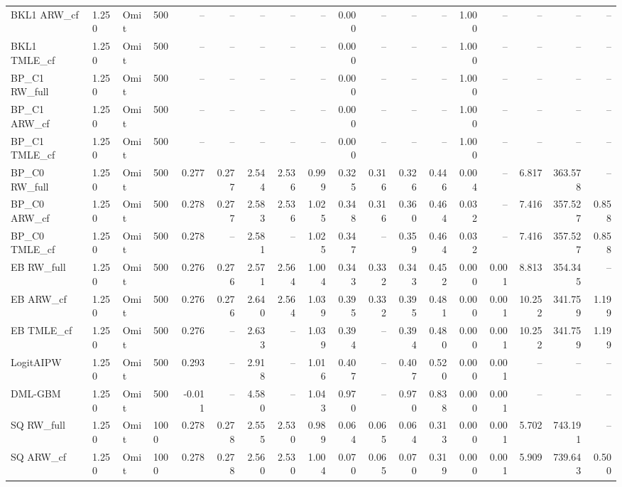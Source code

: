 \begin{tabular}{llllrrrrrrrrrrrrrr}
BKL1 ARW\_cf & 1.250 & Omit & 500 & -- & -- & -- & -- & -- & 0.000 & -- & -- & -- & 1.000 & -- & -- & -- & -- \\
BKL1 TMLE\_cf & 1.250 & Omit & 500 & -- & -- & -- & -- & -- & 0.000 & -- & -- & -- & 1.000 & -- & -- & -- & -- \\
BP\_C1 RW\_full & 1.250 & Omit & 500 & -- & -- & -- & -- & -- & 0.000 & -- & -- & -- & 1.000 & -- & -- & -- & -- \\
BP\_C1 ARW\_cf & 1.250 & Omit & 500 & -- & -- & -- & -- & -- & 0.000 & -- & -- & -- & 1.000 & -- & -- & -- & -- \\
BP\_C1 TMLE\_cf & 1.250 & Omit & 500 & -- & -- & -- & -- & -- & 0.000 & -- & -- & -- & 1.000 & -- & -- & -- & -- \\
BP\_C0 RW\_full & 1.250 & Omit & 500 & 0.277 & 0.277 & 2.544 & 2.536 & 0.999 & 0.325 & 0.316 & 0.326 & 0.446 & 0.004 & -- & 6.817 & 363.578 & -- \\
BP\_C0 ARW\_cf & 1.250 & Omit & 500 & 0.278 & 0.277 & 2.583 & 2.536 & 1.025 & 0.348 & 0.316 & 0.360 & 0.464 & 0.032 & -- & 7.416 & 357.527 & 0.858 \\
BP\_C0 TMLE\_cf & 1.250 & Omit & 500 & 0.278 & -- & 2.581 & -- & 1.025 & 0.347 & -- & 0.359 & 0.464 & 0.032 & -- & 7.416 & 357.527 & 0.858 \\
EB RW\_full & 1.250 & Omit & 500 & 0.276 & 0.276 & 2.571 & 2.564 & 1.004 & 0.343 & 0.332 & 0.343 & 0.452 & 0.000 & 0.001 & 8.813 & 354.345 & -- \\
EB ARW\_cf & 1.250 & Omit & 500 & 0.276 & 0.276 & 2.640 & 2.564 & 1.039 & 0.395 & 0.332 & 0.395 & 0.481 & 0.000 & 0.001 & 10.252 & 341.759 & 1.199 \\
EB TMLE\_cf & 1.250 & Omit & 500 & 0.276 & -- & 2.633 & -- & 1.039 & 0.394 & -- & 0.394 & 0.480 & 0.000 & 0.001 & 10.252 & 341.759 & 1.199 \\
LogitAIPW & 1.250 & Omit & 500 & 0.293 & -- & 2.918 & -- & 1.016 & 0.407 & -- & 0.407 & 0.520 & 0.000 & 0.001 & -- & -- & -- \\
DML-GBM & 1.250 & Omit & 500 & -0.011 & -- & 4.580 & -- & 1.043 & 0.970 & -- & 0.970 & 0.838 & 0.000 & 0.001 & -- & -- & -- \\
SQ RW\_full & 1.250 & Omit & 1000 & 0.278 & 0.278 & 2.555 & 2.530 & 0.989 & 0.064 & 0.065 & 0.064 & 0.313 & 0.000 & 0.001 & 5.702 & 743.191 & -- \\
SQ ARW\_cf & 1.250 & Omit & 1000 & 0.278 & 0.278 & 2.560 & 2.530 & 1.004 & 0.070 & 0.065 & 0.070 & 0.319 & 0.000 & 0.001 & 5.909 & 739.643 & 0.500 \\

\end{tabular}
